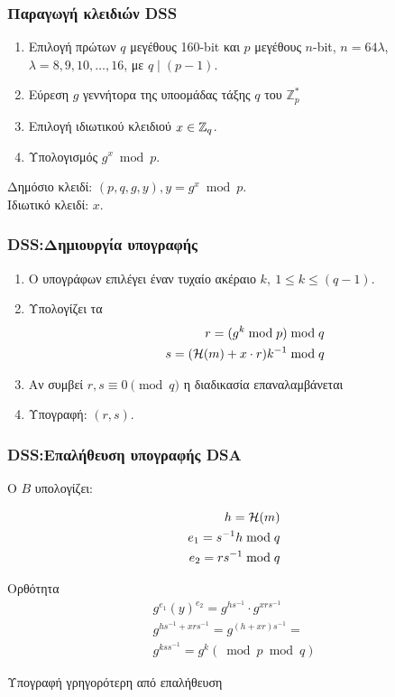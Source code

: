 \documentclass{beamer}
\begin{document}
\begin{frame}
\frametitle{Παραγωγή κλειδιών DSS}

\begin{block}{}
\begin{enumerate}
\item Επιλογή πρώτων $q$ μεγέθους 160-bit και $p$ μεγέθους $n$-bit, $n=64{\lambda}$, $\lambda=8,9,10,\ldots,16$, με $q \mid (p-1)$.\pause
\item Εύρεση $g$ γεννήτορα της υποομάδας τάξης $q$ του $\mathbb{Z}_p^*$ \pause
\item Επιλογή ιδιωτικού κλειδιού $x \in \mathbb{Z}_q$.\pause
\item Υπολογισμός $g^x \bmod{p}$. 
\end{enumerate}
\pause
\begin{flushleft}
Δημόσιο κλειδί: $(p,q,g,y), y = g^x \bmod p$.\\
Ιδιωτικό κλειδί: $x$.
\end{flushleft}
\end{block}

\end{frame}


\begin{frame} \frametitle{DSS:Δημιουργία υπογραφής}

\begin{block}{}
\begin{enumerate}
\item Ο υπογράφων επιλέγει έναν τυχαίο ακέραιο $k,\ 1 \leq k \leq (q-1)$.\pause
\item Υπολογίζει τα \pause
\begin{align*}
r  =   (g^k \bmod{p}) \bmod{q}  \\
s  =   (\mathcal{H}(m)+ x \cdot r)k^{-1}\bmod{q}
\end{align*} 
\item Αν συμβεί $r,s \equiv 0\pmod{q}$ η διαδικασία επαναλαμβάνεται \pause
\item Υπογραφή: $(r,s)$.
\end{enumerate}
\end{block}
\end{frame}


\begin{frame}\frametitle{DSS:Επαλήθευση υπογραφής DSA}
Ο $B$ υπολογίζει:

\begin{align*}
h=\mathcal{H}(m) \\
e_1  =   s^{-1} h \bmod{q} \\
e_2  =   rs^{-1}  \bmod{q} 
\end{align*}		 
\pause
{}
\pause
\begin{block}{Ορθότητα}
\begin{align*}
g^{e_1}(y)^{e_2}  = 
g^{hs^{-1}} \cdot g^{xrs^{-1}}  \\
g^{hs^{-1}+xrs^{-1}}  = 
g^{(h+xr)s^{-1}} = \\
g^{kss^{-1}} = 
g^{k} (\bmod{p} \bmod{q})
\end{align*}
\end{block}
\pause
\alert{Υπογραφή γρηγορότερη από επαλήθευση}
\end{frame}
\end{document}
